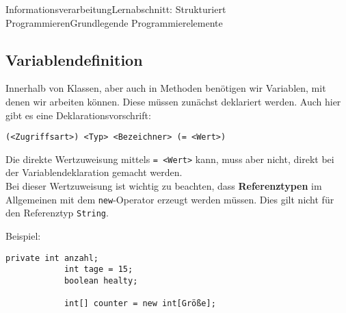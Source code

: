 \documentclass[11pt,oneside,openany,headings=optiontotoc,11pt,numbers=noenddot]{article}
\begin{document}
\begin{worksheet}{Informationsverarbeitung}{Lernabschnitt: Strukturiert Programmieren}{Grundlegende Programmierelemente}
		\subsection{Variablendefinition}
		Innerhalb von Klassen, aber auch in Methoden benötigen wir Variablen, mit denen wir arbeiten können. Diese müssen zunächst deklariert werden. Auch hier gibt es eine Deklarationsvorschrift:
		\begin{lstlisting}[style=JavaInputStyle]
			(<Zugriffsart>) <Typ> <Bezeichner> (= <Wert>)
		\end{lstlisting}
		Die direkte Wertzuweisung mittels \lstinline[style=JavaInputStyle]{= <Wert>} kann, muss aber nicht, direkt bei der Variablendeklaration gemacht werden.\\
		Bei dieser \grq{}Wertzuweisung\grq{} ist wichtig zu beachten, dass \textbf{Referenztypen} im Allgemeinen mit dem \lstinline[style=JavaInputStyle]{new}-Operator erzeugt werden müssen. Dies gilt nicht für den Referenztyp \lstinline[style=JavaInputStyle]{String}.\\
		\par\noindent
		Beispiel:
		\begin{lstlisting}[style=JavaInputStyle,frame=single]
			private int anzahl;
			int tage = 15;
			boolean healty;
			
			int[] counter = new int[Größe];
		\end{lstlisting}

\end{worksheet}
\end{document}
